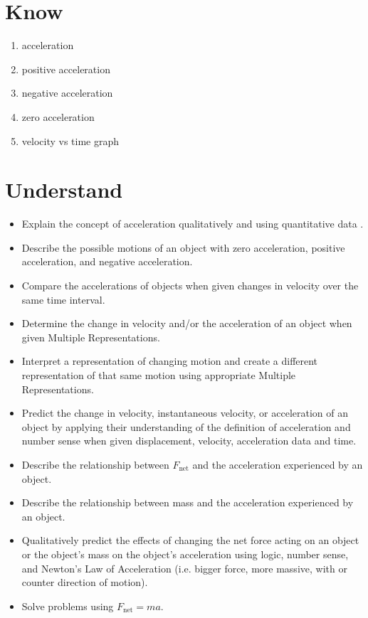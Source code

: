 \documentclass[answers]{exam}
\begin{document}
\section*{Know}

\begin{multicols}{2}
\begin{enumerate}[itemsep=0pt]
    \item acceleration
    \item positive acceleration 
    \item negative acceleration
    \item zero acceleration
    \item velocity vs time graph
\end{enumerate}
\end{multicols}

\section*{Understand}

\begin{itemize}[itemsep=0pt]
    \item Explain the concept of acceleration qualitatively 
    and using quantitative data 
    .
    \item Describe the possible motions of an object with zero acceleration, positive acceleration, and negative acceleration.
    \item Compare the accelerations of objects when given changes in velocity over the same time interval.
    \item Determine the change in velocity and/or the acceleration of an object when given Multiple Representations.
    \item Interpret a representation of changing motion and create a different representation of that same motion using appropriate Multiple Representations.
    \item Predict the change in velocity, instantaneous velocity, or acceleration of an object by applying their understanding of the definition of acceleration and number sense when given displacement, velocity, acceleration data and time.
    \item Describe the relationship between $F_\mathrm{net}$ and the acceleration experienced by an object.
    \item Describe the relationship between mass and the acceleration experienced by an object.
    \item Qualitatively predict the effects of changing the net force acting on an object or the object’s mass on the object’s acceleration using logic, number sense, and Newton’s Law of Acceleration (i.e. bigger force, more massive, with or counter direction of motion).
    \item Solve problems using $F_\mathrm{net} = ma$.
\end{itemize}
\end{document}
